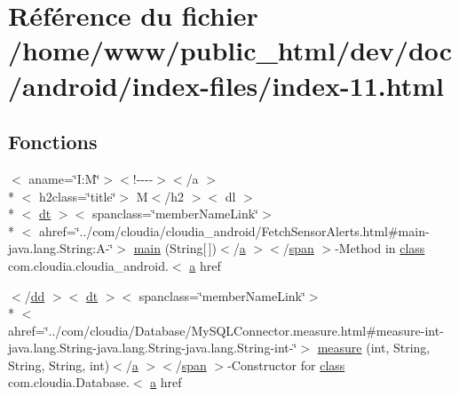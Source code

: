 \hypertarget{index-11_8html}{\section{Référence du fichier /home/www/public\-\_\-html/dev/doc/android/index-\/files/index-\/11.html}
\label{index-11_8html}
}
\subsection*{Fonctions}
\begin{DoxyCompactItemize}
\item 
$<$ aname=\char`\"{}I\-:\-M\char`\"{}$>$$<$!-\/-\/-\/-\/$>$$<$/a $>$\\*
$<$ h2class=\char`\"{}title\char`\"{}$>$ M$<$/h2 $>$$<$ dl $>$\\*
$<$ \hyperlink{stylesheet_8css_a107565fb4039d33b041380d6e0ea1d80}{dt} $>$$<$ spanclass=\char`\"{}member\-Name\-Link\char`\"{}$>$\\*
$<$ ahref=\char`\"{}../com/cloudia/cloudia\-\_\-android/Fetch\-Sensor\-Alerts.\-html\#main-\/java.\-lang.\-String\-:\-A-\/\char`\"{}$>$ \hyperlink{index-11_8html_a6c68a2b1e7512100570684c4917732d7}{main} (String\mbox{[}$\,$\mbox{]})$<$/\hyperlink{style_8css_a5e8981582017bb8b84c21f148345d1f7}{a} $>$$<$/\hyperlink{stylesheet_8css_a8343996ebcf16220b04e54659aac31cc}{span} $>$-\/Method in \hyperlink{_tools_8html_acf06f836132665ba8114f5a414c2403f}{class} com.\-cloudia.\-cloudia\-\_\-android.$<$ \hyperlink{style_8css_a5e8981582017bb8b84c21f148345d1f7}{a} href
\item 
$<$/\hyperlink{stylesheet_8css_a47f4718a86835a7771ec592ece845221}{dd} $>$$<$ \hyperlink{stylesheet_8css_a107565fb4039d33b041380d6e0ea1d80}{dt} $>$$<$ spanclass=\char`\"{}member\-Name\-Link\char`\"{}$>$\\*
$<$ ahref=\char`\"{}../com/cloudia/Database/My\-S\-Q\-L\-Connector.\-measure.\-html\#measure-\/int-\/java.\-lang.\-String-\/java.\-lang.\-String-\/java.\-lang.\-String-\/int-\/\char`\"{}$>$ \hyperlink{index-11_8html_acafc813e7e06597a079f86f5cdd7d5f9}{measure} (int, String, String, String, int)$<$/\hyperlink{style_8css_a5e8981582017bb8b84c21f148345d1f7}{a} $>$$<$/\hyperlink{stylesheet_8css_a8343996ebcf16220b04e54659aac31cc}{span} $>$-\/Constructor for \hyperlink{_tools_8html_acf06f836132665ba8114f5a414c2403f}{class} com.\-cloudia.\-Database.$<$ \hyperlink{style_8css_a5e8981582017bb8b84c21f148345d1f7}{a} href

\end{DoxyCompactItemize}
